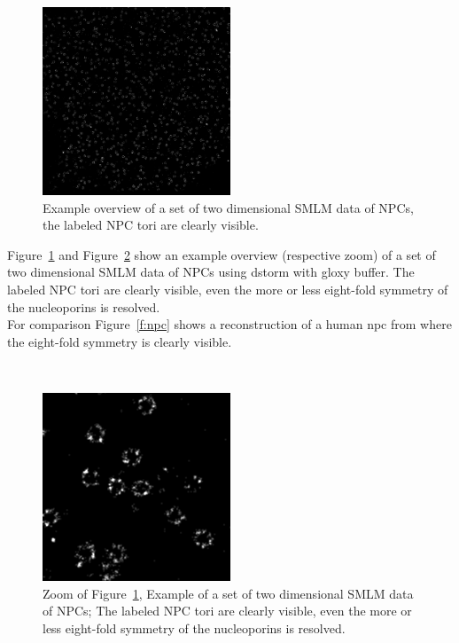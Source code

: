 \documentclass[11pt, a4paper, oneside, twocolumn]{report}
\newcommand{\x}[1]{#1\index{#1}}
\begin{document}
\begin{figure}[h]
  \centering
  \includegraphics[width=0.5\textwidth]{npc/npc2048.png}
  \caption{Example overview of a set of two dimensional SMLM data of
    NPCs, the labeled NPC tori are clearly visible.}
  \label{f:npco}
\end{figure}

Figure~\ref{f:npco} and Figure~\ref{f:npcz} show an example overview
(respective zoom) of a set of two dimensional SMLM data of NPCs using
\gls{dstorm} with \gls{gloxy} buffer. The labeled NPC tori are clearly
visible, even the more or less eight-fold symmetry of the
\x{nucleoporin}s is resolved.\\

For comparison Figure~\ref{f:npc} shows a reconstruction of a human
\gls{npc} from \cite{npc} where the eight-fold symmetry is clearly
visible.

\newpage
~ %
\begin{figure}[!t]
  \centering
  \includegraphics[width=0.5\textwidth]{npc/npc256.png}
  \caption{Zoom of Figure~\ref{f:npco}, Example of a set of two
    dimensional SMLM data of NPCs; The labeled NPC tori are clearly
    visible, even the more or less eight-fold symmetry of the
    nucleoporins is resolved.}
  \label{f:npcz}
\end{figure}
\end{document}
